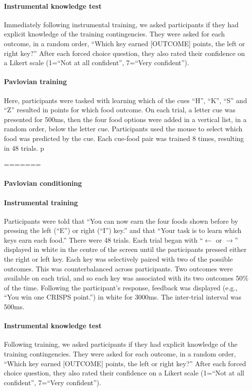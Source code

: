 \documentclass[12pt]{article}
\begin{document}
\paragraph{Instrumental knowledge test}
Immediately following instrumental training, we asked participants if they had explicit knowledge of the training contingencies. They were asked for each outcome, in a random order, ``Which key earned [OUTCOME] points, the left or right key?'' After each forced
choice question, they also rated their confidence on a Likert scale (1=``Not at
all confident'', 7=``Very confident''). 

\paragraph{Pavlovian training}
Here, participants were tasked with learning which of the cues ``H'', ``K'', ``S'' and ``Z'' resulted in points for which food outcome. On each trial, a letter cue was presented for 500ms, then the four food options were added in a vertical list, in a random order, below the letter cue. Participants used the mouse to select which food was predicted by the cue. Each cue-food pair was trained 8 times, resulting in 48 trials. p

=======
\paragraph{Pavlovian conditioning}

\paragraph{Instrumental training} Participants were told that ``You can now
earn the four foods shown before by pressing the left (``E'') or right (``I'')
key.'' and that ``Your task is to learn which keys earn each food.'' There were
48 trials. Each trial began with ``$\leftarrow$ or $\rightarrow$'' displayed in
white in the centre of the screen until the participants pressed either the
right or left key. Each key was selectively paired with two of the possible
outcomes. This was counterbalanced across participants. Two outcomes were
available on each trial, and so each key was associated with its two outcomes
50\% of the time. Following the participant's response, feedback was displayed 
(e.g., ``You win one CRISPS point.'') in white for 3000ms. The inter-trial
interval was 500ms.

\paragraph{Instrumental knowledge test}
Following training, we asked participants if they had explicit knowledge of the
training contingencies. They were asked for each outcome, in a random order,
``Which key earned [OUTCOME] points, the left or right key?'' After each forced
choice question, they also rated their confidence on a Likert scale (1=``Not at
all confident'', 7=``Very confident''). 
\end{document}
